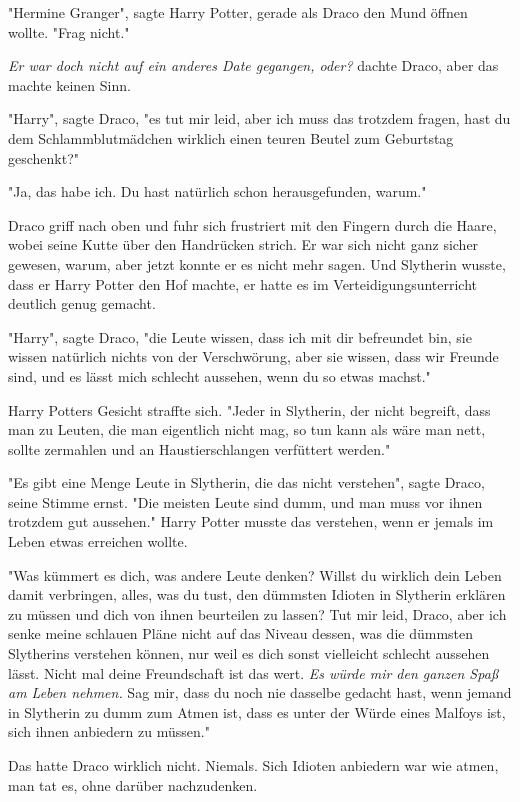 {"Hermine Granger", sagte Harry Potter, gerade als Draco den Mund öffnen wollte. "Frag nicht."

\emph{Er war doch nicht auf ein anderes Date gegangen, oder?} dachte Draco, aber das machte keinen Sinn.

"Harry", sagte Draco, "es tut mir leid, aber ich muss das trotzdem fragen, hast du dem Schlammblutmädchen wirklich einen teuren Beutel zum Geburtstag geschenkt?"

"Ja, das habe ich. Du hast natürlich schon herausgefunden, warum."

Draco griff nach oben und fuhr sich frustriert mit den Fingern durch die Haare, wobei seine Kutte über den Handrücken strich. Er war sich nicht ganz sicher gewesen, warum, aber jetzt konnte er es nicht mehr sagen. Und Slytherin wusste, dass er Harry Potter den Hof machte, er hatte es im Verteidigungsunterricht deutlich genug gemacht.

"Harry", sagte Draco, "die Leute wissen, dass ich mit dir befreundet bin, sie wissen natürlich nichts von der Verschwörung, aber sie wissen, dass wir Freunde sind, und es lässt mich schlecht aussehen, wenn du so etwas machst."

Harry Potters Gesicht straffte sich. "Jeder in Slytherin, der nicht begreift, dass man zu Leuten, die man eigentlich nicht mag, so tun kann als wäre man nett, sollte zermahlen und an Haustierschlangen verfüttert werden."

"Es gibt eine Menge Leute in Slytherin, die das nicht verstehen", sagte Draco, seine Stimme ernst. "Die meisten Leute sind dumm, und man muss vor ihnen trotzdem gut aussehen." Harry Potter musste das verstehen, wenn er jemals im Leben etwas erreichen wollte.

"Was kümmert es dich, was andere Leute denken? Willst du wirklich dein Leben damit verbringen, alles, was du tust, den dümmsten Idioten in Slytherin erklären zu müssen und dich von ihnen beurteilen zu lassen? Tut mir leid, Draco, aber ich senke meine schlauen Pläne nicht auf das Niveau dessen, was die dümmsten Slytherins verstehen können, nur weil es dich sonst vielleicht schlecht aussehen lässt. Nicht mal deine Freundschaft ist das wert. \emph{Es würde mir den ganzen Spaß am Leben nehmen.} Sag mir, dass du noch nie dasselbe gedacht hast, wenn jemand in Slytherin zu dumm zum Atmen ist, dass es unter der Würde eines Malfoys ist, sich ihnen anbiedern zu müssen."

Das hatte Draco wirklich nicht. Niemals. Sich Idioten anbiedern war wie atmen, man tat es, ohne darüber nachzudenken.

}
